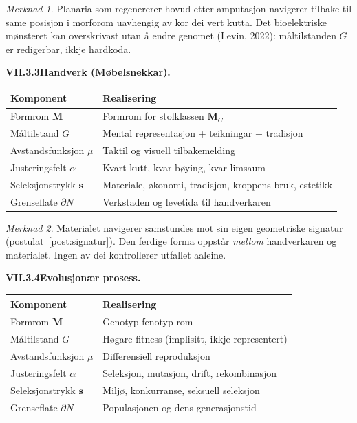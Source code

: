 \documentclass[11pt, a4paper]{article}
\theoremstyle{definition}
\theoremstyle{plain}
\theoremstyle{remark}
\newtheorem*{merknad}{Merknad}
\newcommand{\MC}{\mathbf{M}_C}
\newcommand{\svec}{\mathbf{s}}
\begin{document}
\begin{merknad}
Planaria som regenererer hovud etter amputasjon navigerer tilbake til same posisjon i
morforom uavhengig av kor dei vert kutta.
Det bioelektriske m\o nsteret kan overskrivast utan \aa{} endre genomet (Levin, 2022):
m\aa ltilstanden $G$ er redigerbar, ikkje hardkoda.
\end{merknad}

\bigskip
\noindent\textbf{VII.3.3\quad Handverk (M\o belsnekkar).}

\medskip
\begin{center}
\begin{tabular}{@{}l >{\raggedright\arraybackslash}p{8cm}@{}}
\toprule
\textbf{Komponent} & \textbf{Realisering} \\
\midrule
Formrom $\mathbf{M}$         & Formrom for stolklassen $\MC$ \\
M\aa ltilstand $G$            & Mental representasjon + teikningar + tradisjon \\
Avstandsfunksjon $\mu$        & Taktil og visuell tilbakemelding \\
Justeringsfelt $\alpha$       & Kvart kutt, kvar b\o ying, kvar limsaum \\
Seleksjonstrykk $\svec$       & Materiale, \o konomi, tradisjon, kroppens bruk, estetikk \\
Grenseflate $\partial N$      & Verkstaden og levetida til handverkaren \\
\bottomrule
\end{tabular}
\end{center}

\begin{merknad}
Materialet navigerer samstundes mot sin eigen geometriske signatur
(postulat~\ref{post:signatur}). Den ferdige forma oppst\aa r \emph{mellom} handverkaren
og materialet. Ingen av dei kontrollerer utfallet aaleine.
\end{merknad}

\bigskip
\noindent\textbf{VII.3.4\quad Evolusjon\ae r prosess.}

\medskip
\begin{center}
\begin{tabular}{@{}l >{\raggedright\arraybackslash}p{8cm}@{}}
\toprule
\textbf{Komponent} & \textbf{Realisering} \\
\midrule
Formrom $\mathbf{M}$         & Genotyp-fenotyp-rom \\
M\aa ltilstand $G$            & H\o gare fitness (implisitt, ikkje representert) \\
Avstandsfunksjon $\mu$        & Differensiell reproduksjon \\
Justeringsfelt $\alpha$       & Seleksjon, mutasjon, drift, rekombinasjon \\
Seleksjonstrykk $\svec$       & Milj\o, konkurranse, seksuell seleksjon \\
Grenseflate $\partial N$      & Populasjonen og dens generasjonstid \\
\bottomrule
\end{tabular}
\end{center}
\end{document}

